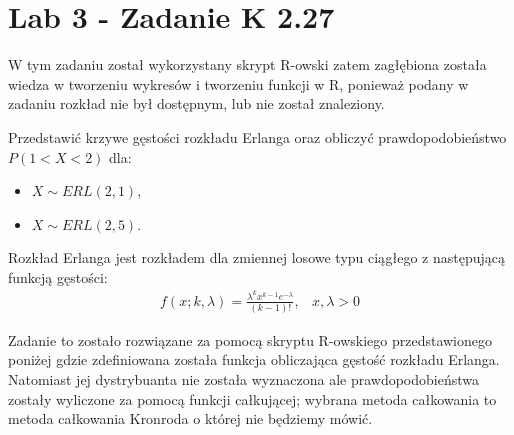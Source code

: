\documentclass{article}
\begin{document}
\section{Lab 3 - Zadanie K 2.27}
W tym zadaniu został wykorzystany skrypt R-owski zatem zagłębiona została wiedza w tworzeniu wykresów i tworzeniu funkcji w R, ponieważ podany w zadaniu rozkład nie był dostępnym, lub nie został znaleziony. \\ \par

Przedstawić krzywe gęstości rozkładu Erlanga oraz obliczyć prawdopodobieństwo
$P(1 < X < 2)$ dla: 
\begin{itemize}
\item $X \sim ERL(2, 1)$,
\item $X \sim ERL(2, 5)$.
\end{itemize}

Rozkład Erlanga jest rozkładem dla zmiennej losowe typu ciągłego z następującą funkcją gęstości:
\[\begin{array}{cc} f(x;k,\lambda) = \frac{\lambda^kx^{k-1}e^{-\lambda}}{(k-1)!}, & x,\lambda > 0 \end{array} \]

Zadanie to zostało rozwiązane za pomocą skryptu R-owskiego przedstawionego poniżej gdzie zdefiniowana została funkcja obliczająca gęstość rozkładu Erlanga. Natomiast jej dystrybuanta nie została wyznaczona ale prawdopodobieństwa zostały wyliczone za pomocą funkcji całkującej; wybrana metoda całkowania to metoda całkowania Kronroda o której nie będziemy mówić.
\end{document}

